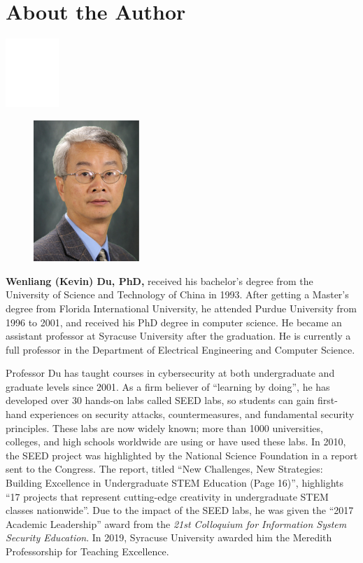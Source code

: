 


\chapter*{About the Author}


\includegraphics[width=0.15\textwidth]{empty.pdf}\par\vspace{0.7cm}
 

\begin{figure}
  \vspace{-12pt}
  \includegraphics[width=4cm]{du_pic.jpg}
\end{figure}
\noindent \textbf{Wenliang (Kevin) Du, PhD,} received his bachelor's degree from the University 
of Science and Technology of China in 1993. After getting a Master's degree from 
Florida International University, he attended Purdue University from 
1996 to 2001, and received his PhD degree in computer science. 
He became an assistant professor at Syracuse University after the graduation. 
He is currently a full professor in the
Department of Electrical Engineering and Computer Science.


Professor Du has taught courses in cybersecurity at both undergraduate 
and graduate levels since 2001. As a firm believer of ``learning by doing'', 
he has developed over 30 hands-on labs called SEED labs, so students can 
gain first-hand experiences on security attacks, countermeasures, and 
fundamental security principles. These labs are now widely known;
more than 1000 universities, colleges, and high schools worldwide 
are using or have used these labs. 
In 2010,  the SEED project was highlighted by the National Science Foundation 
in a report sent to the Congress. The report,  titled ``New Challenges, 
New Strategies: Building Excellence in Undergraduate STEM Education (Page 16)'', 
highlights ``17 projects that represent cutting-edge
creativity in undergraduate STEM classes nationwide''. Due to the impact of the 
SEED labs, he was given the ``2017 Academic Leadership'' award from the 
\textit{21st Colloquium for Information System Security Education}. 
In 2019, Syracuse University awarded him the Meredith Professorship 
for Teaching Excellence.


